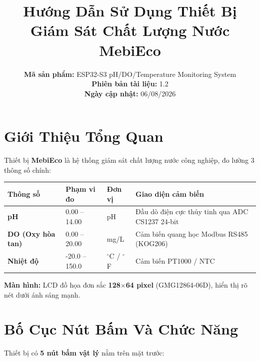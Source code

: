 \documentclass[12pt,a4paper]{article}
\begin{document}
\title{\textbf{Hướng Dẫn Sử Dụng Thiết Bị\\Giám Sát Chất Lượng Nước MebiEco}}
\author{}
\date{
    \textbf{Mã sản phẩm:} ESP32-S3 pH/DO/Temperature Monitoring System\\
    \textbf{Phiên bản tài liệu:} 1.2\\
    \textbf{Ngày cập nhật:} 06/08/2026
}
\maketitle
\thispagestyle{empty} %

\tableofcontents
\newpage


\section{Giới Thiệu Tổng Quan}

Thiết bị \textbf{MebiEco} là hệ thống giám sát chất lượng nước công nghiệp, đo lường 3 thông số chính:

\begin{table}[H]
\centering
\begin{tabularx}{\textwidth}{|l|l|l|X|}
\hline
\textbf{Thông số} & \textbf{Phạm vi đo} & \textbf{Đơn vị} & \textbf{Giao diện cảm biến} \\ \hline
\textbf{pH} & 0.00 -- 14.00 & pH & Đầu dò điện cực thủy tinh qua ADC CS1237 24-bit \\ \hline
\textbf{DO (Oxy hòa tan)} & 0.00 -- 20.00 & mg/L & Cảm biến quang học Modbus RS485 (KOG206) \\ \hline
\textbf{Nhiệt độ} & -20.0 -- 150.0 & $^\circ$C / $^\circ$F & Cảm biến PT1000 / NTC \\ \hline
\end{tabularx}
\end{table}

\textbf{Màn hình:} LCD đồ họa đơn sắc \textbf{128$\times$64 pixel} (GMG12864-06D), hiển thị rõ nét dưới ánh sáng mạnh.


\section{Bố Cục Nút Bấm Và Chức Năng}

Thiết bị có \textbf{5 nút bấm vật lý} nằm trên mặt trước:
\end{document}
